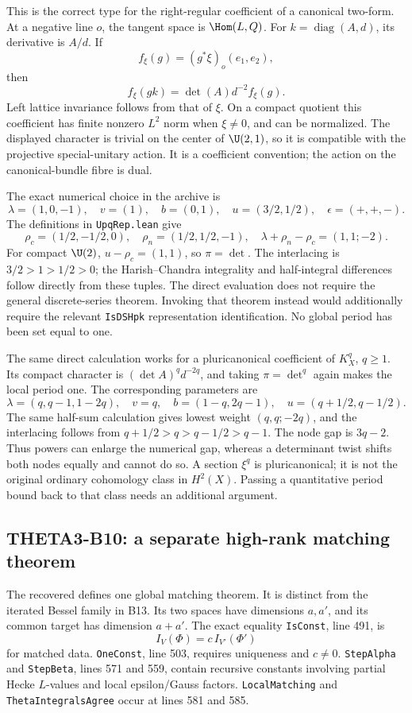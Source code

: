 \documentclass[11pt]{article}
\theoremstyle{definition}\newtheorem{definition}[theorem]{Definition}\newtheorem{remark}[theorem]{Remark}
\begin{document}
This is the correct type for the right-regular coefficient of a canonical two-form. At a negative line $o$, the tangent space is $\Hom(L,Q)$. For $k=\operatorname{diag}(A,d)$, its derivative is $A/d$. If
\[
 f_\xi(g)=(g^*\xi)_o(e_1,e_2),
\]
then
\[
 f_\xi(gk)=\det(A)d^{-2}f_\xi(g).
\]
Left lattice invariance follows from that of $\xi$. On a compact quotient this coefficient has finite nonzero $L^2$ norm when $\xi\ne0$, and can be normalized. The displayed character is trivial on the center of $\U(2,1)$, so it is compatible with the projective special-unitary action. It is a coefficient convention; the action on the canonical-bundle fibre is dual.

The exact numerical choice in the archive is
\[
 \lambda=(1,0,-1),\quad v=(1),\quad b=(0,1),\quad
 u=(3/2,1/2),\quad\epsilon=(+,+,-).
\]
The definitions in \texttt{UpqRep.lean} give
\[
 \rho_c=(1/2,-1/2,0),\quad\rho_n=(1/2,1/2,-1),\quad
 \lambda+\rho_n-\rho_c=(1,1;-2).
\]
For compact $\U(2)$, $u-\rho_c=(1,1)$, so $\pi=\det$. The interlacing is
$3/2>1>1/2>0$; the Harish--Chandra integrality and half-integral differences follow directly from these tuples. The direct evaluation does not require the general discrete-series theorem. Invoking that theorem instead would additionally require the relevant \texttt{IsDSHpk} representation identification. No global period has been set equal to one.

The same direct calculation works for a pluricanonical coefficient of $K_X^q$, $q\geq1$. Its compact character is $(\det A)^qd^{-2q}$, and taking $\pi=\det^q$ again makes the local period one. The corresponding parameters are
\[
 \lambda=(q,q-1,1-2q),\quad v=q,\quad
 b=(1-q,2q-1),\quad u=(q+1/2,q-1/2).
\]
The same half-sum calculation gives lowest weight $(q,q;-2q)$, and the interlacing follows from
$q+1/2>q>q-1/2>q-1$. The node gap is $3q-2$. Thus powers can enlarge the numerical gap, whereas a determinant twist shifts both nodes equally and cannot do so. A section $\xi^q$ is pluricanonical; it is not the original ordinary cohomology class in $H^2(X)$. Passing a quantitative period bound back to that class needs an additional argument.

\subsection{THETA3-B10: a separate high-rank matching theorem}\label{B10}

The recovered  defines one global matching theorem. It is distinct from the iterated Bessel family in B13. Its two spaces have dimensions $a,a'$, and its common target has dimension $a+a'$. The exact equality \texttt{IsConst}, line 491, is
\[
 I_V(\Phi)=c\,I_{V'}(\Phi')
\]
for matched data. \texttt{OneConst}, line 503, requires uniqueness and $c\ne0$. \texttt{StepAlpha} and \texttt{StepBeta}, lines 571 and 559, contain recursive constants involving partial Hecke $L$-values and local epsilon/Gauss factors. \texttt{LocalMatching} and \texttt{ThetaIntegralsAgree} occur at lines 581 and 585.
\end{document}
